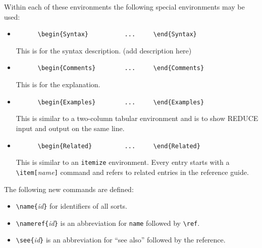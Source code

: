 Within each of these environments the following special environments
may be used:
\begin{itemize}
  \item
    \begin{verbatim}
      \begin{Syntax}          ...     \end{Syntax}
\end{verbatim}
    This is for the syntax description. (add description here)
  \item
    \begin{verbatim}
      \begin{Comments}        ...     \end{Comments}
\end{verbatim}
    This is for the explanation.
  \item 
    \begin{verbatim}
      \begin{Examples}        ...     \end{Examples}
\end{verbatim}
    This is similar to a two-column tabular environment and is to show
    REDUCE input and output on the same line.
  \item
    \begin{verbatim}
      \begin{Related}         ...     \end{Related}
\end{verbatim}
    This is similar to an \verb|itemize| environment. Every entry
    starts with a \verb|\item[|{\it name\/}\verb|]| command and refers
    to related entries in the reference guide.
\end{itemize}

The following new commands are defined:
\begin{itemize}
  \item \verb|\name{|{\it id\/}\verb|}| for identifiers of all sorts.
  \item \verb|\nameref{|{\it id\/}\verb|}| is an abbreviation for
        \verb|name| followed by \verb|\ref|.
  \item \verb|\see{|{\it id\/}\verb|}| is an abbreviation for ``see
        also'' followed by the reference.
\end{itemize}


